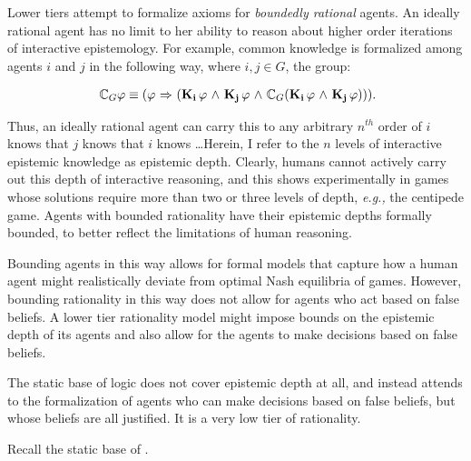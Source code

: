Lower tiers attempt to formalize axioms for \emph{boundedly rational} agents. An ideally rational agent has no limit to her ability to reason about higher order iterations of interactive epistemology. For example, common knowledge is formalized among agents $i$ and $j$ in the following way, where $i,j\in G$, the group:

\begin{eqnarray}~\label{common_knowledge}
	\mathbb{C}_{G}\varphi \equiv (\varphi {\ \Rightarrow \ } (\mathbf{K}_{\mathbf{i}}\,\varphi {\ \wedge \ } \mathbf{K}_{\mathbf{j}}\,\varphi {\ \wedge \ } \mathbb{C}_{G}(\mathbf{K}_{\mathbf{i}}\,\varphi {\ \wedge \ } \mathbf{K}_{\mathbf{j}}\,\varphi))).
\end{eqnarray}

Thus, an ideally rational agent can carry this to any arbitrary $\mathit{n^{th}}$ order of $i$ knows that $j$ knows that $i$ knows \dots Herein, I refer to the $n$ levels of interactive epistemic knowledge as epistemic depth. Clearly, humans cannot actively carry out this depth of interactive reasoning, and this shows experimentally in games whose solutions require more than two or three levels of depth, \emph{e.g.,} the centipede game. Agents with bounded rationality have their epistemic depths formally bounded, to better reflect the limitations of human reasoning.

Bounding agents in this way allows for formal models that capture how a human agent might realistically deviate from optimal Nash equilibria of games. However, bounding rationality in this way does not allow for agents who act based on false beliefs. A lower tier rationality model might impose bounds on the epistemic depth of its agents and also allow for the agents to make decisions based on false beliefs.

The static base of \DASL logic does not cover epistemic depth at all, and instead attends to the formalization of agents who can make decisions based on false beliefs, but whose beliefs are all justified. It is a very low tier of rationality.

Recall the static base of \DASL.

